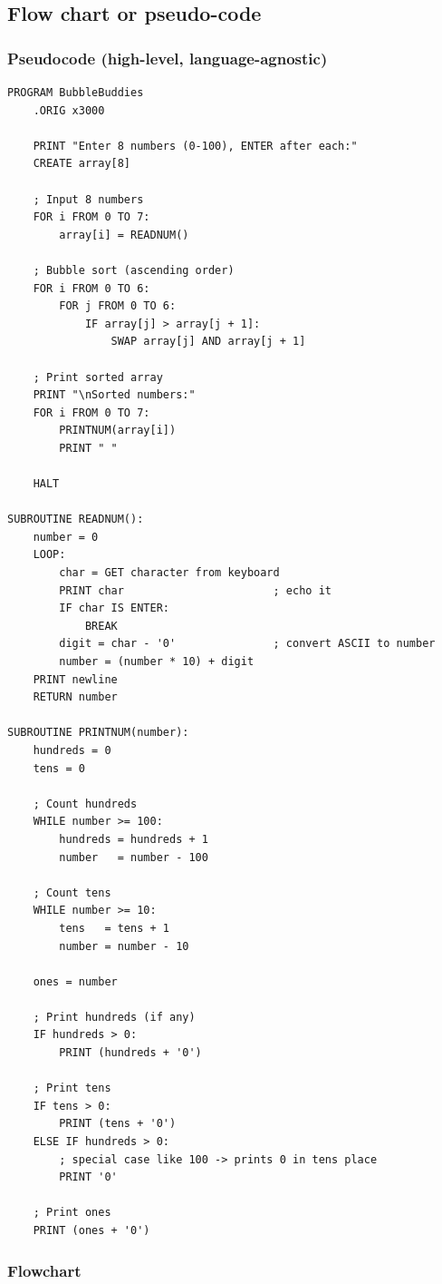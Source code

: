 \documentclass[11pt]{article}
\begin{document}
\subsection*{Flow chart or pseudo-code}

\subsubsection*{Pseudocode (high-level, language-agnostic)}

\begin{verbatim}
PROGRAM BubbleBuddies
    .ORIG x3000

    PRINT "Enter 8 numbers (0-100), ENTER after each:"
    CREATE array[8]

    ; Input 8 numbers
    FOR i FROM 0 TO 7:
        array[i] = READNUM()

    ; Bubble sort (ascending order)
    FOR i FROM 0 TO 6:
        FOR j FROM 0 TO 6:
            IF array[j] > array[j + 1]:
                SWAP array[j] AND array[j + 1]

    ; Print sorted array
    PRINT "\nSorted numbers:"
    FOR i FROM 0 TO 7:
        PRINTNUM(array[i])
        PRINT " "

    HALT

SUBROUTINE READNUM():
    number = 0
    LOOP:
        char = GET character from keyboard
        PRINT char                       ; echo it
        IF char IS ENTER:
            BREAK
        digit = char - '0'               ; convert ASCII to number
        number = (number * 10) + digit
    PRINT newline
    RETURN number

SUBROUTINE PRINTNUM(number):
    hundreds = 0
    tens = 0

    ; Count hundreds
    WHILE number >= 100:
        hundreds = hundreds + 1
        number   = number - 100

    ; Count tens
    WHILE number >= 10:
        tens   = tens + 1
        number = number - 10

    ones = number

    ; Print hundreds (if any)
    IF hundreds > 0:
        PRINT (hundreds + '0')

    ; Print tens
    IF tens > 0:
        PRINT (tens + '0')
    ELSE IF hundreds > 0:
        ; special case like 100 -> prints 0 in tens place
        PRINT '0'

    ; Print ones
    PRINT (ones + '0')
\end{verbatim}

\subsubsection*{Flowchart}
\end{document}
